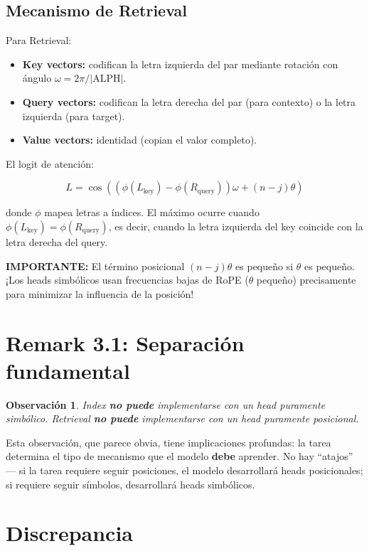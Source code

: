 \documentclass[12pt,a4paper,oneside]{report}
\newtheorem{remark}{Observación}[chapter]
\begin{document}
\subsection{Mecanismo de Retrieval}

Para Retrieval:

\begin{itemize}
    \item \textbf{Key vectors:} codifican la letra izquierda del par mediante rotación con ángulo $\omega = 2\pi/|\text{ALPH}|$.
    \item \textbf{Query vectors:} codifican la letra derecha del par (para contexto) o la letra izquierda (para target).
    \item \textbf{Value vectors:} identidad (copian el valor completo).
\end{itemize}

El logit de atención:

\[
L = \cos((\phi(L_{\text{key}}) - \phi(R_{\text{query}}))\omega + (n - j)\theta)
\]

donde $\phi$ mapea letras a índices. El máximo ocurre cuando $\phi(L_{\text{key}}) = \phi(R_{\text{query}})$, es decir, cuando la letra izquierda del key coincide con la letra derecha del query.

\textbf{IMPORTANTE:} El término posicional $(n-j)\theta$ es pequeño si $\theta$ es pequeño. ¡Los heads simbólicos usan frecuencias bajas de RoPE ($\theta$ pequeño) precisamente para minimizar la influencia de la posición!

\section{Remark 3.1: Separación fundamental}

\begin{remark}
Index \textbf{no puede} implementarse con un head puramente simbólico. Retrieval \textbf{no puede} implementarse con un head puramente posicional.
\end{remark}

Esta observación, que parece obvia, tiene implicaciones profundas: la tarea determina el tipo de mecanismo que el modelo \textbf{debe} aprender. No hay ``atajos'' — si la tarea requiere seguir posiciones, el modelo desarrollará heads posicionales; si requiere seguir símbolos, desarrollará heads simbólicos.

\section{Discrepancia}
\end{document}
